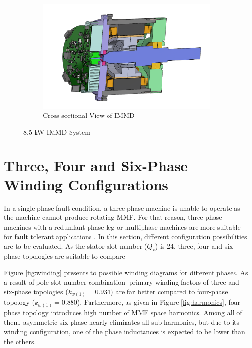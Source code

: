\documentclass[a4paper,11pt]{article}
\begin{document}
\begin{figure}[ht!]
\begin{subfigure}[b]{0.33\textwidth}
    \label{fig:s6phmmf}    
\end{subfigure}
\begin{subfigure}[b]{0.33\textwidth}
    \centering
    \includegraphics[width=\linewidth]{immd_csview.PNG}
    \caption{Cross-sectional View of IMMD}
    \label{fig:as6phmmf}    
\end{subfigure}
 \caption{8.5 kW IMMD System}
 \label{fig:8kw}
\end{figure}


\section{\normalsize\textbf{Three, Four and Six-Phase Winding Configurations}}
In a single phase fault condition, a three-phase machine is unable to operate as the machine cannot produce rotating MMF. For that reason, three-phase machines with a redundant phase leg or multiphase machines are more suitable for fault tolerant applications \cite{phaseleg}.
In this section, different configuration possibilities are to be evaluated. As the stator slot number ($Q_s$) is 24, three, four and six phase topologies are suitable to compare.\par
Figure \ref{fig:winding} presents to possible winding diagrams for different phases. As a result of pole-slot number combination, primary winding factors of three and six-phase topologies ($k_{w(1)} = 0.934$) are far better compared to four-phase topology ($k_{w(1)} = 0.880$). Furthermore, as given in Figure \ref{fig:harmonics}, four-phase topology introduces high number of MMF space harmonics. Among all of them, asymmetric six phase nearly eliminates all sub-harmonics, but due to its winding configuration, one of the phase inductances is expected to be lower than the others.
\end{document}
